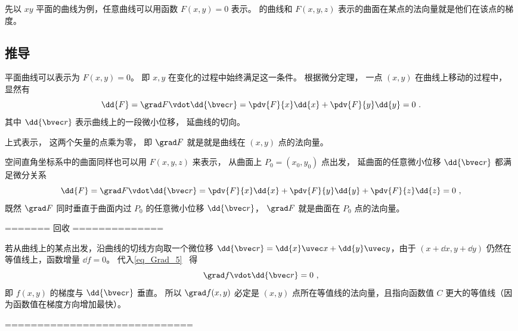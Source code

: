 
\begin{issues}
\issueDraft
\end{issues}


先以 $xy$ 平面的曲线为例，任意曲线可以用函数 $F(x, y) = 0$ 表示。 的曲线和 $F(x, y, z)$ 表示的曲面在某点的法向量就是他们在该点的梯度。

\subsection{推导}

平面曲线可以表示为 $F(x, y) = 0$。 即 $x, y$ 在变化的过程中始终满足这一条件。 根据微分定理， 一点 $(x, y)$ 在曲线上移动的过程中， 显然有
\begin{equation}
\dd{F} = \grad F \vdot \dd{\bvec r} = \pdv{F}{x} \dd{x} + \pdv{F}{y} \dd{y} = 0~.
\end{equation}
其中 $\dd{\bvec r}$ 表示曲线上的一段微小位移， 延曲线的切向。

上式表示， 这两个矢量的点乘为零， 即 $\grad F$ 就是就是曲线在 $(x,y)$ 点的法向量。

空间直角坐标系中的曲面同样也可以用 $F(x, y, z)$ 来表示， 从曲面上 $P_0 = (x_0, y_0)$ 点出发， 延曲面的任意微小位移 $\dd{\bvec r}$ 都满足微分关系
\begin{equation}
\dd{F} = \grad F \vdot \dd{\bvec r} = \pdv{F}{x} \dd{x} + \pdv{F}{y} \dd{y} + \pdv{F}{z} \dd{z} = 0~,
\end{equation}
既然 $\grad F$ 同时垂直于曲面内过 $P_0$ 的任意微小位移 $\dd{\bvec r}$， $\grad F$ 就是曲面在 $P_0$ 点的法向量。

======= 回收 ==============

若从曲线上的某点出发，沿曲线的切线方向取一个微位移 $\dd{\bvec r} = \dd{x}\uvec x + \dd{y} \uvec y$，由于 $(x+\dd{x}, y+\dd{y})$ 仍然在等值线上，函数增量 $\dd{f} = 0$。 代入\autoref{eq_Grad_5}~ 得
\begin{equation}
\grad f \vdot \dd{\bvec r} = 0~,
\end{equation}
即 $f(x,y)$ 的梯度与 $\dd{\bvec r}$ 垂直。 所以 $\grad f(x,y)$ 必定是 $(x,y)$ 点所在等值线的法向量，且指向函数值 $C$ 更大的等值线（因为函数值在梯度方向增加最快）。

=============================
